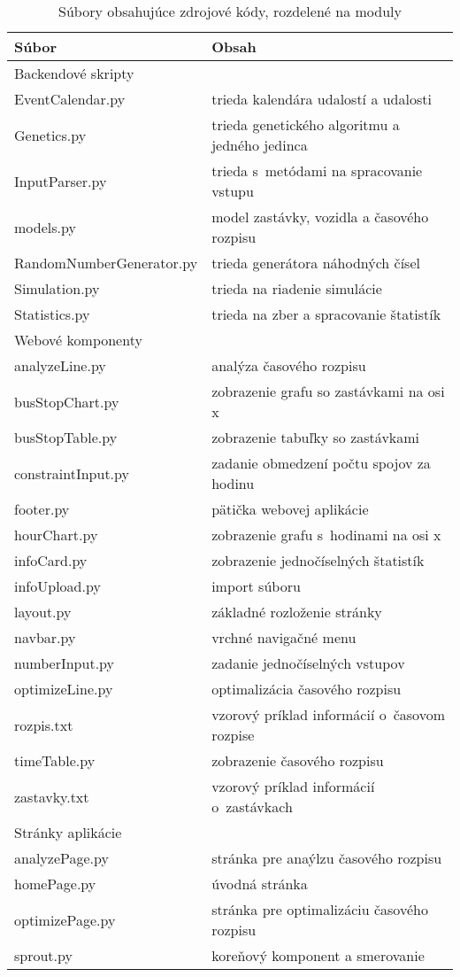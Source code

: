 \begin{table}[h]\label{tab:source_codes}
  \centering
  \begin{tabularx}{\textwidth}{|l|X|}
    \hline
    \textbf{Súbor} & \textbf{Obsah} \\ \hline
    Backendové skripty & \\
    EventCalendar.py & trieda kalendára udalostí a udalosti \\
    Genetics.py & trieda genetického algoritmu a jedného jedinca \\
    InputParser.py & trieda s~metódami na spracovanie vstupu \\
    models.py &  model zastávky, vozidla a časového rozpisu\\
    RandomNumberGenerator.py & trieda generátora náhodných čísel \\
    Simulation.py & trieda na riadenie simulácie \\
    Statistics.py & trieda na zber a spracovanie štatistík \\ \hline
    Webové komponenty & \\
    analyzeLine.py & analýza časového rozpisu \\
    busStopChart.py & zobrazenie grafu so zastávkami na osi x \\
    busStopTable.py &zobrazenie tabuľky so zastávkami \\
    constraintInput.py & zadanie obmedzení počtu spojov za hodinu \\
    footer.py & pätička webovej aplikácie \\
    hourChart.py & zobrazenie grafu s~hodinami na osi x \\
    infoCard.py & zobrazenie jednočíselných štatistík \\
    infoUpload.py & import súboru \\
    layout.py & základné rozloženie stránky \\
    navbar.py & vrchné navigačné menu \\
    numberInput.py & zadanie jednočíselných vstupov \\
    optimizeLine.py & optimalizácia časového rozpisu \\
    rozpis.txt & vzorový príklad informácií o~časovom rozpise \\
    timeTable.py & zobrazenie časového rozpisu \\
    zastavky.txt & vzorový príklad informácií o~zastávkach \\ \hline
    Stránky aplikácie & \\
    analyzePage.py & stránka pre anaýlzu časového rozpisu \\
    homePage.py & úvodná stránka \\
    optimizePage.py & stránka pre optimalizáciu časového rozpisu \\ \hline
    sprout.py & koreňový komponent a smerovanie \\ \hline
  \end{tabularx}
  \caption{Súbory obsahujúce zdrojové kódy, rozdelené na moduly}
\end{table}

